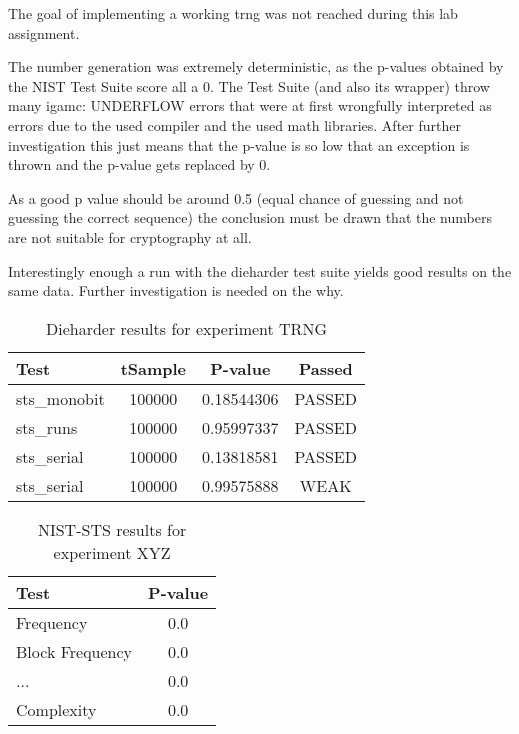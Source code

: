 The goal of implementing a working \gls{trng} was not reached during this lab assignment. 

The number generation was extremely deterministic, as the p-values obtained by the NIST Test
Suite score all a 0. The Test Suite (and also its wrapper) throw many igamc: UNDERFLOW
errors that were at first wrongfully interpreted as errors due to the used compiler and
the used math libraries. 
After further investigation this just means that the p-value is so low that an exception
is thrown and the p-value gets replaced by 0. 

As a good p value should be around 0.5 (equal chance of guessing and not guessing the
correct sequence) the conclusion must be drawn that the numbers are not suitable for
cryptography at all. 

Interestingly enough a run with the dieharder test suite yields good results on the same
data. Further investigation is needed on the why.

\begin{table}[htp]
	\centering
	\caption{Dieharder results for experiment TRNG}
	\label{tbl:results}
	\begin{tabular}{lccc}

		\hline
		\textbf{Test} & \textbf{tSample} &\textbf{P-value} &\textbf{Passed} \\
		\hline
         sts_monobit&       100000&     0.18544306&  PASSED  \\ 
            sts_runs&       100000&     0.95997337&  PASSED  \\
          sts_serial&       100000&     0.13818581&  PASSED  \\
          sts_serial&       100000&     0.99575888&   WEAK   \\
		\hline
	\end{tabular}

\end{table}
\begin{table}[htp]
	\centering
	\caption{NIST-STS results for experiment XYZ}
	\label{tbl:NISTresults}
	\begin{tabular}{lc}

		\hline
		\textbf{Test} & \textbf{P-value} \\
		\hline

		Frequency & 0.0\\
		Block Frequency & 0.0\\
		... & 0.0\\
		Complexity & 0.0\\
		\hline

	\end{tabular}

\end{table}

